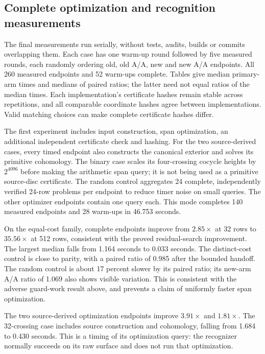 \subsection{Complete optimization and recognition measurements}

The final measurements run serially, without tests, audits, builds or
commits overlapping them. Each case has one warm-up round followed by
five measured rounds, each randomly ordering old, old A/A, new and new
A/A endpoints. All 260 measured endpoints and 52 warm-ups complete.
Tables give median primary-arm times and medians of paired ratios;
the latter need not equal ratios of the median times. Each implementation's
certificate hashes remain stable across repetitions, and all comparable
coordinate hashes agree between implementations. Valid matching choices
can make complete certificate hashes differ.

The first experiment includes input construction, span optimization,
an additional independent certificate check and hashing. For the two
source-derived cases, every timed endpoint also constructs the canonical
exterior and solves its primitive cohomology. The binary case scales its
four-crossing cocycle heights by $2^{4096}$ before making the arithmetic
span query; it is not being used as a primitive source-disc certificate.
The random control aggregates 24 complete, independently verified
24-row problems per endpoint to reduce timer noise on small queries.
The other optimizer endpoints contain one query each. This mode completes
140 measured endpoints and 28 warm-ups in 46.753 seconds.

\begin{center}
\small
\end{center}

On the equal-cost family, complete endpoints improve from $2.85\times$
at 32 rows to $35.56\times$ at 512 rows, consistent with the proved
residual-search improvement. The largest median falls from 1.164 seconds
to 0.033 seconds. The distinct-cost control is close to parity, with a
paired ratio of 0.985 after the bounded handoff. The random control is
about 17 percent slower by its paired ratio; its new-arm A/A ratio of
1.069 also shows visible variation. This is consistent with the adverse
guard-work result above, and prevents a claim of uniformly faster span
optimization.

The two source-derived optimization endpoints improve $3.91\times$ and
$1.81\times$. The 32-crossing case includes source construction and
cohomology, falling from 1.684 to 0.430 seconds. This is a timing of its
optimization query: the recognizer normally succeeds on its raw surface
and does not run that optimization.


